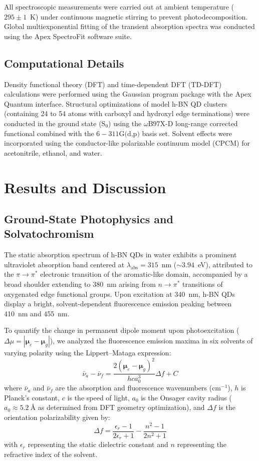 \documentclass[journal=jpcbfk,manuscript=article,layout=twocolumn]{achemso}
\begin{document}
All spectroscopic measurements were carried out at ambient temperature ($295 \pm 1$~K) under continuous magnetic stirring to prevent photodecomposition. Global multiexponential fitting of the transient absorption spectra was conducted using the Apex SpectroFit software suite.

\subsection{Computational Details}
Density functional theory (DFT) and time-dependent DFT (TD-DFT) calculations were performed using the Gaussian program package with the Apex Quantum interface. Structural optimizations of model h-BN QD clusters (containing 24 to 54 atoms with carboxyl and hydroxyl edge terminations) were conducted in the ground state ($\text{S}_0$) using the $\omega\text{B97X-D}$ long-range corrected functional combined with the $6-311\text{G(d,p)}$ basis set. Solvent effects were incorporated using the conductor-like polarizable continuum model (CPCM) for acetonitrile, ethanol, and water.

\section{Results and Discussion}

\subsection{Ground-State Photophysics and Solvatochromism}
The static absorption spectrum of h-BN QDs in water exhibits a prominent ultraviolet absorption band centered at $\lambda_{\text{abs}} = 315$~nm ($\sim 3.94$~eV), attributed to the $\pi \to \pi^*$ electronic transition of the aromatic-like  domain, accompanied by a broad shoulder extending to 380~nm arising from $n \to \pi^*$ transitions of oxygenated edge functional groups. Upon excitation at 340~nm, h-BN QDs display a bright, solvent-dependent fluorescence emission peaking between 410~nm and 455~nm.

To quantify the change in permanent dipole moment upon photoexcitation ($\Delta \mu = |\boldsymbol{\mu}_e - \boldsymbol{\mu}_g|$), we analyzed the fluorescence emission maxima in six solvents of varying polarity using the Lippert--Mataga expression:
\begin{equation}
\bar{\nu}_a - \bar{\nu}_f = \frac{2(\boldsymbol{\mu}_e - \boldsymbol{\mu}_g)^2}{h c a_0^3} \Delta f + C
\label{eq:lippert}
\end{equation}
where $\bar{\nu}_a$ and $\bar{\nu}_f$ are the absorption and fluorescence wavenumbers ($\text{cm}^{-1}$), $h$ is Planck's constant, $c$ is the speed of light, $a_0$ is the Onsager cavity radius ($a_0 \approx 5.2~\text{\AA}$ as determined from DFT geometry optimization), and $\Delta f$ is the orientation polarizability given by:
\begin{equation}
\Delta f = \frac{\epsilon_r - 1}{2\epsilon_r + 1} - \frac{n^2 - 1}{2n^2 + 1}
\label{eq:polarizability}
\end{equation}
with $\epsilon_r$ representing the static dielectric constant and $n$ representing the refractive index of the solvent.
\end{document}
